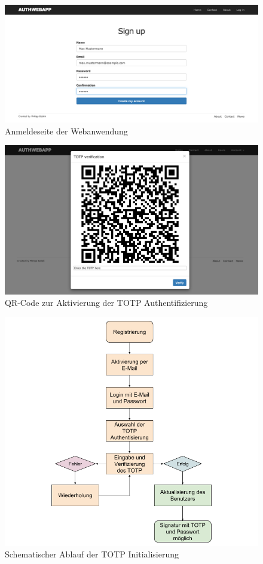 \documentclass[11pt,a4paper,ngerman]{scrreprt}
\begin{document}
\begin{figure}[htbp]
    \centering
        \includegraphics[width=\textwidth]{Abbildungen/Authwebapp_login}
    \caption{Anmeldeseite der Webanwendung}
    \label{fig:Authwebapp_login}
\end{figure}
\begin{figure}[htbp]
    \centering
        \includegraphics[width=\textwidth]{Abbildungen/Authwebapp_qr}
    \caption{QR-Code zur Aktivierung der TOTP Authentifizierung}
    \label{fig:Authwebapp_qr}
\end{figure}
\begin{figure}[htbp]
    \centering
        \includegraphics[width=\textwidth]{Abbildungen/Ablauf_TOTP_Initialisierung}
    \caption{Schematischer Ablauf der TOTP Initialisierung}
    \label{fig:totp-init}
\end{figure}
\end{document}
